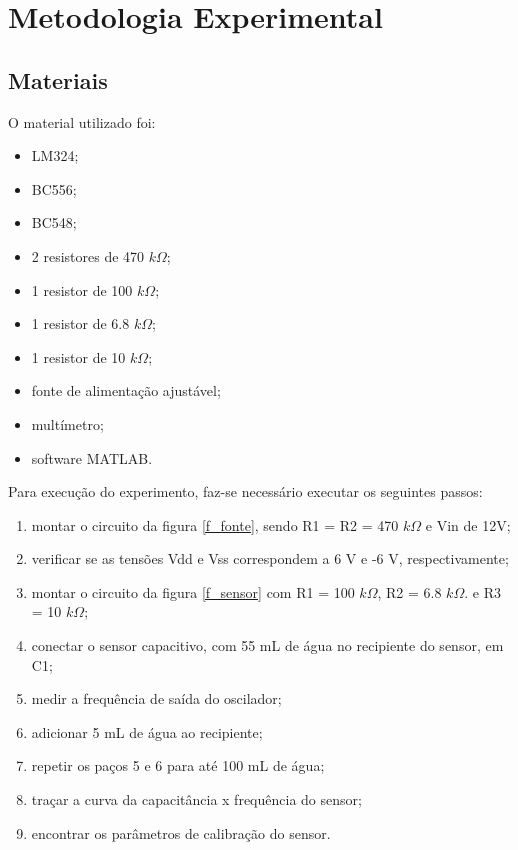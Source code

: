 \newpage
\section{Metodologia Experimental}

\subsection{Materiais}
O material utilizado foi:
\begin{itemize}
\item LM324;
\item BC556;
\item BC548;
\item 2 resistores de 470 $k\Omega$;
\item 1 resistor de 100 $k\Omega$;
\item 1 resistor de 6.8 $k\Omega$;
\item 1 resistor de 10 $k\Omega$;
\item fonte de alimentação ajustável;
\item multímetro;
\item software MATLAB.
\end{itemize}

Para execução do experimento, faz-se necessário executar os seguintes passos:

\begin{enumerate}
\item montar o circuito da figura \ref{f_fonte}, sendo R1 = R2 = 470 $k\Omega$ e Vin de 12V;
\item verificar se as tensões Vdd e Vss correspondem a 6 V e -6 V, respectivamente;
\item montar o circuito da figura \ref{f_sensor} com R1 = 100 $k\Omega$, R2 = 6.8 $k\Omega$. e R3 = 10 $k\Omega$;
\item conectar o sensor capacitivo, com 55 mL de água no recipiente do sensor, em C1;
\item medir a frequência de saída do oscilador;
\item adicionar 5 mL de água ao recipiente;
\item repetir os paços 5 e 6 para até 100 mL de água;
\item traçar a curva da capacitância x frequência do sensor;
\item encontrar os parâmetros de calibração do sensor.
\end{enumerate}
